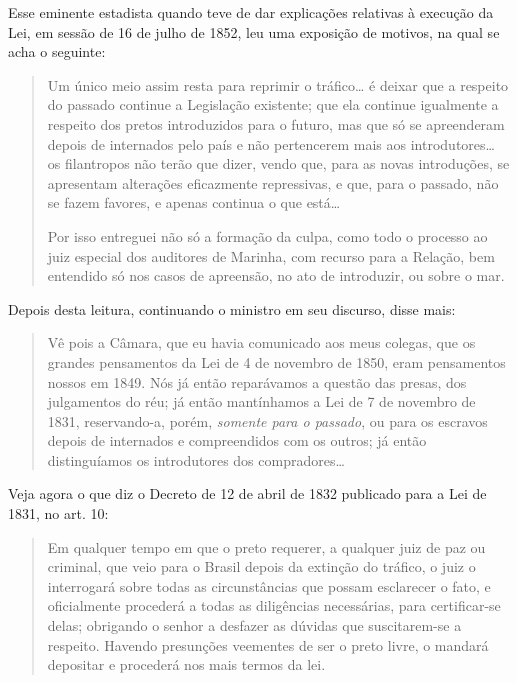 {Esse eminente estadista quando teve de dar explicações relativas à
execução da Lei, em sessão de 16 de julho de 1852, leu uma exposição de
motivos, na qual se acha o seguinte:

\begin{quote}
Um único meio assim resta para reprimir o tráfico\ldots{} é deixar que a
respeito do passado continue a Legislação existente; que ela continue
igualmente a respeito dos pretos introduzidos para o futuro, mas que só
se apreenderam depois de internados pelo 
país  
e não pertencerem mais aos introdutores\ldots{} os filantropos não
terão que dizer, vendo que, para as
novas introduções, se
apresentam alterações eficazmente repressivas, e
que, para o passado, não se fazem favores, e apenas continua o que
está\ldots{}

Por isso entreguei não só a formação da culpa, como todo o processo ao
juiz especial dos auditores de Marinha, com recurso para a Relação, bem
entendido só nos casos de apreensão, no ato de introduzir, ou sobre o
mar.
\end{quote}

Depois desta leitura, continuando o ministro em seu discurso, disse mais:

\begin{quote}
Vê pois a Câmara, que eu havia comunicado aos meus colegas, que os
grandes pensamentos da Lei de 4 de novembro de 1850, eram pensamentos
nossos em 1849. Nós já então reparávamos a questão das presas, dos
julgamentos do réu; já então mantínhamos a Lei de 7 de novembro de 1831,
reservando-a, porém, \emph{somente para o passado}, ou para os escravos
depois de internados e compreendidos com os outros; já então
distinguíamos os introdutores dos compradores\ldots{}
\end{quote}

Veja agora o que diz o Decreto de 12 de abril de 1832 publicado para a
Lei de 1831, no art. 10:

\begin{quote}
Em qualquer tempo em que o preto requerer, a qualquer juiz de paz ou
criminal, que veio para o Brasil depois da extinção do tráfico, o juiz o
interrogará sobre todas as circunstâncias que possam esclarecer o fato,
e oficialmente procederá a todas as diligências necessárias, para
certificar-se delas; obrigando o senhor a desfazer as dúvidas que
suscitarem-se a respeito. Havendo presunções veementes de ser o preto
livre, o mandará depositar e procederá nos mais termos da lei.
\end{quote}

}
